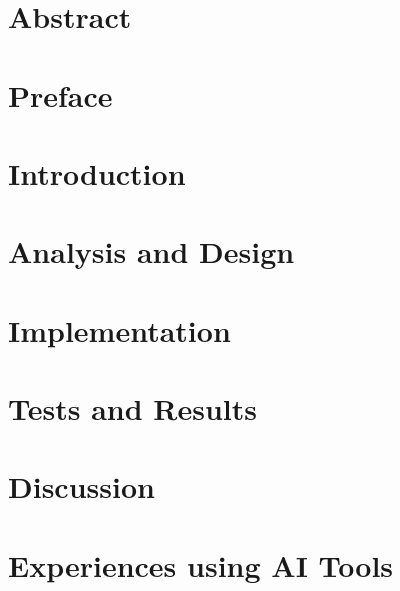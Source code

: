 






\section*{Abstract} \label{sec:abstract}

\newpage
\section*{Preface} \label{sec:preface}

\newpage

\tableofcontents
\newpage

\setcounter{page}{1}


\section{Introduction} \label{sec:intro}


\section{Analysis and Design} \label{sec:design}


\newpage
\section{Implementation} \label{sec:impl}



\section{Tests and Results} \label{sec:tests}


\newpage
\section{Discussion} \label{sec:disc}



\section{Experiences using AI Tools} \label{sec:aitools}


